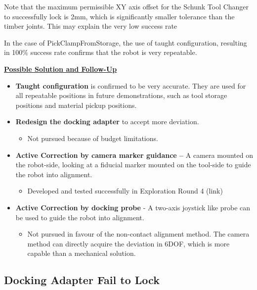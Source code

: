 {Note that the maximum permissible XY axis offset for the Schunk Tool Changer to successfully lock is 2mm, which is significantly smaller tolerance than the timber joints. This may explain the very low success rate

In the case of PickClampFromStorage, the use of taught configuration, resulting in 100$\%$ success rate confirms that the robot is very repeatable. 

\textbf{\ul{Possible Solution and Follow-Up}}

\begin{itemize}
	\item \textbf{Taught configuration} is confirmed to be very accurate. They are used for all repeatable positions in future demonstrations, such as tool storage positions and material pickup positions.

	\item \textbf{Redesign the docking adapter} to accept more deviation.

\begin{itemize}
	\item Not pursued because of budget limitations.

\end{itemize}
	\item \textbf{Active Correction by camera marker guidance --} A camera mounted on the robot-side, looking at a fiducial marker mounted on the tool-side to guide the robot into alignment.

\begin{itemize}
	\item Developed and tested successfully in Exploration Round 4 (link)

\end{itemize}
	\item  \textbf{Active Correction by docking probe} - A two-axis joystick like probe can be used to guide the robot into alignment.

\begin{itemize}
	\item Not pursued in favour of the non-contact alignment method. The camera method can directly acquire the deviation in 6DOF, which is more capable than a mechanical solution.

\end{itemize}
\end{itemize}

\subsection{Docking Adapter Fail to Lock}
\label{subsection:exploration_3_docking_adapter_fail_to_lock}

}
